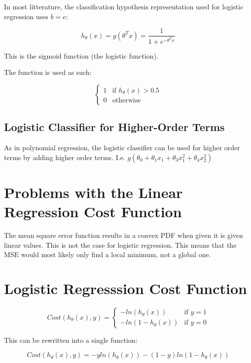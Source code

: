 In most litterature, the classification hypothesis representation used for
logistic regression uses $b = e$:

\[
    h_\theta(x) = g(\theta^Tx) = \frac{1}{1+e^{-\theta^Tx}}
\]
\bigskip

This is the sigmoid function (the logistic function).

The function is used as such:

\begin{equation}
    \left\{\begin{matrix}
        1 & \text{if } h_\theta(x) > 0.5 \\ 
        0 & \text{otherwise}
        \end{matrix}\right.
\end{equation}

\subsection{Logistic Classifier for Higher-Order Terms}
As in polynomial regression, the logistic classifier can be used for higher order terms by adding higher order terms. I.e. $g(\theta_0 + \theta_1x_1+\theta_3x_1^2+\theta_4x_2^2)$

\section{Problems with the Linear Regression Cost Function}
The mean square error function results in a convex PDF when given it is given linear values. This is not the case for logistic regression. This means that the MSE would most likely only find a local minimum, not a global one.

\section{Logistic Regresssion Cost Function}
\begin{equation}
    Cost(h_\theta(x), y) = 
    \left\{\begin{matrix}
        -ln(h_\theta(x)) & \text{if } y=1 \\ 
        -ln(1-h_\theta(x)) & \text{if } y=0
        \end{matrix}\right.
\end{equation}

This can be rewritten into a single function:

\begin{equation}
    Cost(h_\theta(x), y) = -y ln(h_\theta(x)) - (1-y)ln(1-h_\theta(x))
\end{equation}

